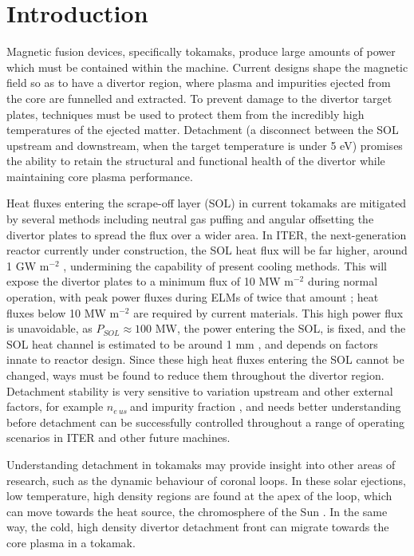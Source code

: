 \documentclass[12pt]{article}  %
\providecommand{\pow}[1]{{$^{#1}$}} %
\providecommand{\neus}{$n_{e~us}~$} %
\begin{document}
\newpage
\section{Introduction}\label{secIntro}
Magnetic fusion devices, specifically tokamaks, produce large amounts of power which must be contained within the machine. Current designs shape the magnetic field so as to have a divertor region, where plasma and impurities ejected from the core are funnelled and extracted. To prevent damage to the divertor target plates, techniques must be used to protect them from the incredibly high temperatures of the ejected matter. Detachment (a disconnect between the SOL upstream and downstream, when the target temperature is under 5 eV) promises the ability to retain the structural and functional health of the divertor while maintaining core plasma performance. 

Heat fluxes entering the scrape-off layer (SOL) in current tokamaks are mitigated by several methods including neutral gas puffing and angular offsetting the divertor plates to spread the flux over a wider area. In ITER, the next-generation reactor currently under construction, the SOL heat flux will be far higher, around 1 GW m\pow{-2} \cite{Loarte2007}, undermining the capability of present cooling methods. This will expose the divertor plates to a minimum flux of 10 MW m\pow{-2} during normal operation, with peak power fluxes during ELMs of twice that amount \cite{Loarte2007}; heat fluxes below 10 MW m\pow{-2} are required by current materials. This high power flux is unavoidable, as $ P_{SOL} \approx 100$ MW, the power entering the SOL, is fixed, and the SOL heat channel is estimated to be around 1 mm \cite{Eich2013}, and depends on factors innate to reactor design. Since these high heat fluxes entering the SOL cannot be changed, ways must be found to reduce them throughout the divertor region. Detachment stability is very sensitive to variation upstream and other external factors, for example \neus and impurity fraction \cite{Lipschultz2016}, and needs better understanding before detachment can be successfully controlled throughout a range of operating scenarios in ITER and other future machines.

Understanding detachment in tokamaks may provide insight into other areas of research, such as the dynamic behaviour of coronal loops. In these solar ejections, low temperature, high density regions are found at the apex of the loop, which can move towards the heat source, the chromosphere of the Sun \cite{Muller2004}. In the same way, the cold, high density divertor detachment front can migrate towards the core plasma in a tokamak.
\end{document}
